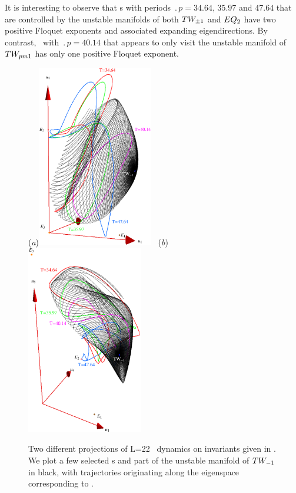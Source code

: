 It is interesting to observe that \rpo s with periods
$\period{p}=34.64$, $35.97$ and $47.64$ that are controlled 
by the unstable manifolds of both $TW_{\pm1}$
and $EQ_{2}$ have two positive Floquet exponents and
associated expanding eigendirections. 
By contrast, \rpo\ with $\period{p}=40.14$ that appears to only visit the unstable manifold of $TW_{pm1}$ has only one positive Floquet
exponent.


\begin{figure}[t]
\begin{center}
  (\textit{a})\includegraphics[width=0.45\textwidth, clip=true]{../figs/ks22tw1umInv2}
~(\textit{b})\includegraphics[width=0.45\textwidth, clip= true]{../figs/ks22tw1umInv}
\end{center}
\caption[\KS\  reduced \statesp\ projection, $\REQV{-}{1}$ unstable manifold]
{Two different projections of L=22 \KS\ dynamics on invariants
given in . We plot a few selected {\rpo s} and part of
the unstable manifold of
$\REQV{-}{1}$ in black, with trajectories originating along the eigenspace
corresponding to \eigExp[1].}
\label{fig:TW1red}
\end{figure}

